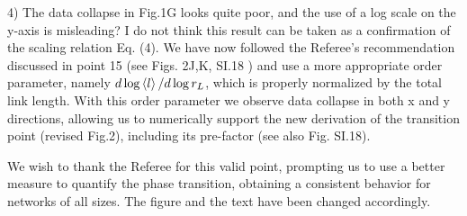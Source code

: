 \documentclass[11pt]{article}
\begin{document}
\begin{response}{
4) The data collapse in Fig.1G looks quite poor, and the use of a log scale on the y-axis is misleading? I do not think this result can be taken as a confirmation of the scaling relation Eq. (4). 
}
We have now followed the Referee's recommendation discussed in point 15 (see Figs. 2J,K,  SI.18%
) and use a more appropriate order parameter, namely $d\log \left<l\right>/d\log r_L$, which is properly normalized by the total link length. 
With this order parameter we observe data collapse in both x and y directions, allowing us to numerically support the new derivation of the transition point (revised Fig.2), including its pre-factor (see also {Fig. SI.18}). 

We wish to thank the Referee for this valid point, prompting us to use a better measure to quantify the phase transition, obtaining a consistent behavior for networks of all sizes. 
The figure and the text have been changed accordingly. 


\end{response}
\end{document}
